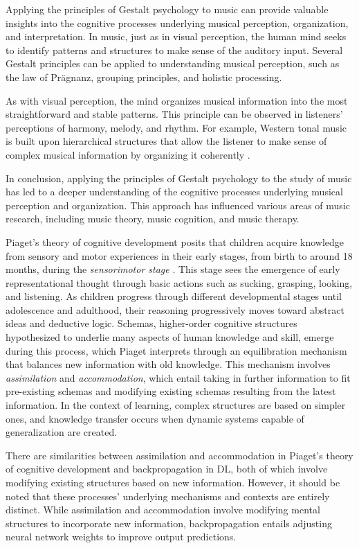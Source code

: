 Applying the principles of Gestalt psychology to music can provide valuable insights into the cognitive processes underlying musical perception, organization, and interpretation. In music, just as in visual perception, the human mind seeks to identify patterns and structures to make sense of the auditory input. Several Gestalt principles can be applied to understanding musical perception, such as the law of Prägnanz, grouping principles, and holistic processing.

As with visual perception, the mind organizes musical information into the most straightforward and stable patterns. This principle can be observed in listeners' perceptions of harmony, melody, and rhythm. For example, Western tonal music is built upon hierarchical structures that allow the listener to make sense of complex musical information by organizing it coherently \cite{Lerdahl1985AMusic}.

In conclusion, applying the principles of Gestalt psychology to the study of music has led to a deeper understanding of the cognitive processes underlying musical perception and organization. This approach has influenced various areas of music research, including music theory, music cognition, and music therapy.


Piaget's theory of cognitive development posits that children acquire knowledge from sensory and motor experiences in their early stages, from birth to around 18 months, during the \textit{sensorimotor stage} \cite{Huitt2003PiagetsDevelopment}. This stage sees the emergence of early representational thought through basic actions such as sucking, grasping, looking, and listening. As children progress through different developmental stages until adolescence and adulthood, their reasoning progressively moves toward abstract ideas and deductive logic. Schemas, higher-order cognitive structures hypothesized to underlie many aspects of human knowledge and skill, emerge during this process, which Piaget interprets through an equilibration mechanism that balances new information with old knowledge. This mechanism involves \textit{assimilation} and \textit{accommodation}, which entail taking in further information to fit pre-existing schemas and modifying existing schemas resulting from the latest information. In the context of learning, complex structures are based on simpler ones, and knowledge transfer occurs when dynamic systems capable of generalization are created. \cite{audioselfsupsurvey}

There are similarities between assimilation and accommodation in Piaget's theory of cognitive development and backpropagation in DL, both of which involve modifying existing structures based on new information. However, it should be noted that these processes' underlying mechanisms and contexts are entirely distinct. While assimilation and accommodation involve modifying mental structures to incorporate new information, backpropagation entails adjusting neural network weights to improve output predictions.

